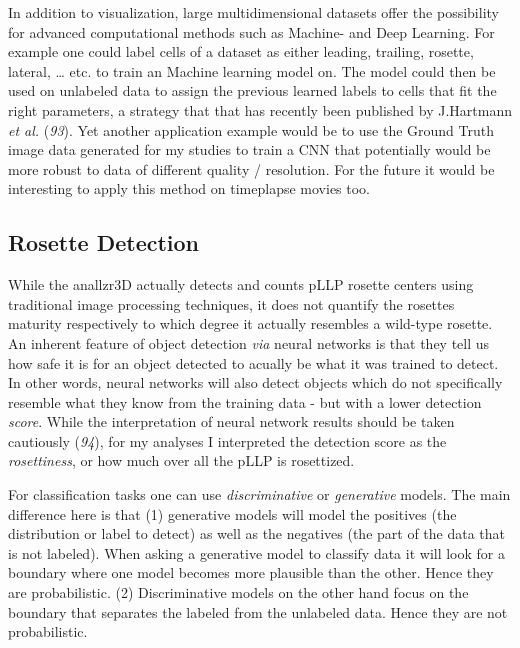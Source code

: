 \documentclass[10pt, b5paper, singlespacinge, twoside]{reedthesis} %
\theoremstyle{definition}
\theoremstyle{definition}
\theoremstyle{definition}
\theoremstyle{remark}
\begin{document}
In addition to visualization, large multidimensional datasets offer the possibility for advanced computational methods such as Machine- and Deep Learning. For example one could label cells of a dataset as either leading, trailing, rosette, lateral, \ldots{} etc. to train an Machine learning model on. The model could then be used on unlabeled data to assign the previous learned labels to cells that fit the right parameters, a strategy that that has recently been published by J.Hartmann \emph{et al.} (\emph{93}). Yet another application example would be to use the Ground Truth image data generated for my studies to train a CNN that potentially would be more robust to data of different quality / resolution. For the future it would be interesting to apply this method on timeplapse movies too.

\hypertarget{rosette-detection-1}{%
\subsection{Rosette Detection}\label{rosette-detection-1}}

While the anallzr3D actually detects and counts pLLP rosette centers using traditional image processing techniques, it does not quantify the rosettes maturity respectively to which degree it actually resembles a wild-type rosette. An inherent feature of object detection \emph{via} neural networks is that they tell us how safe it is for an object detected to acually be what it was trained to detect. In other words, neural networks will also detect objects which do not specifically resemble what they know from the training data - but with a lower detection \emph{score}. While the interpretation of neural network results should be taken cautiously (\emph{94}), for my analyses I interpreted the detection score as the \emph{rosettiness}, or how much over all the pLLP is rosettized.

For classification tasks one can use \emph{discriminative} or \emph{generative} models. The main difference here is that (1) generative models will model the positives (the distribution or label to detect) as well as the negatives (the part of the data that is not labeled). When asking a generative model to classify data it will look for a boundary where one model becomes more plausible than the other. Hence they are probabilistic. (2) Discriminative models on the other hand focus on the boundary that separates the labeled from the unlabeled data. Hence they are not probabilistic.
\end{document}

